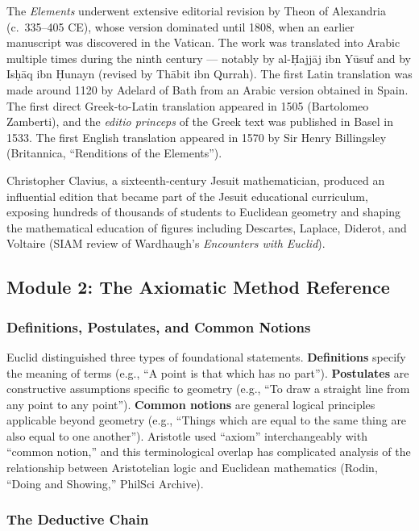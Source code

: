 \documentclass[11pt,letterpaper]{article}
\begin{document}
The \textit{Elements} underwent extensive editorial revision by Theon of Alexandria (c.\ 335--405 CE), whose version dominated until 1808, when an earlier manuscript was discovered in the Vatican. The work was translated into Arabic multiple times during the ninth century --- notably by al-\d{H}ajj\={a}j ibn Y\={u}suf and by Is\d{h}\={a}q ibn \d{H}unayn (revised by Th\={a}bit ibn Qurrah). The first Latin translation was made around 1120 by Adelard of Bath from an Arabic version obtained in Spain. The first direct Greek-to-Latin translation appeared in 1505 (Bartolomeo Zamberti), and the \textit{editio princeps} of the Greek text was published in Basel in 1533. The first English translation appeared in 1570 by Sir Henry Billingsley (Britannica, ``Renditions of the Elements'').

Christopher Clavius, a sixteenth-century Jesuit mathematician, produced an influential edition that became part of the Jesuit educational curriculum, exposing hundreds of thousands of students to Euclidean geometry and shaping the mathematical education of figures including Descartes, Laplace, Diderot, and Voltaire (SIAM review of Wardhaugh's \textit{Encounters with Euclid}).

\subsection{Module 2: The Axiomatic Method Reference}

\subsubsection{Definitions, Postulates, and Common Notions}

Euclid distinguished three types of foundational statements. \textbf{Definitions} specify the meaning of terms (e.g., ``A point is that which has no part''). \textbf{Postulates} are constructive assumptions specific to geometry (e.g., ``To draw a straight line from any point to any point''). \textbf{Common notions} are general logical principles applicable beyond geometry (e.g., ``Things which are equal to the same thing are also equal to one another''). Aristotle used ``axiom'' interchangeably with ``common notion,'' and this terminological overlap has complicated analysis of the relationship between Aristotelian logic and Euclidean mathematics (Rodin, ``Doing and Showing,'' PhilSci Archive).

\subsubsection{The Deductive Chain}
\end{document}

